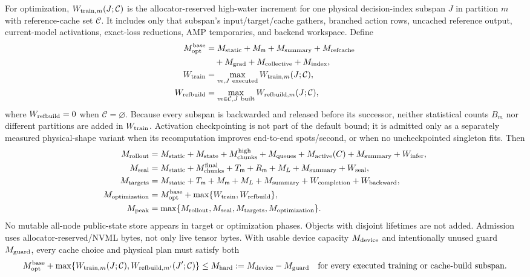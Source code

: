 \documentclass[10pt,a4paper]{article}
\begin{document}
For optimization, $W_{{\rm train},m}(J;\mathcal C)$ is the
allocator-reserved high-water increment for one physical decision-index
subspan $J$ in partition $m$ with reference-cache set $\mathcal C$.  It includes
only that subspan's input/target/cache gathers, branched action rows, uncached
reference output, current-model activations, exact-loss reductions, AMP
temporaries, and backend workspace.  Define
\begin{align*}
 M_{\rm opt}^{\rm base}
  &=M_{\rm static}+M_{\mathsf m}+M_{\rm summary}+M_{\rm refcache}\\
  &\quad+M_{\rm grad}+M_{\rm collective}+M_{\rm index},\\
 W_{\rm train}
  &=\max_{m,J\ {\rm executed}}W_{{\rm train},m}(J;\mathcal C),\\
 W_{\rm refbuild}
  &=\max_{m\in\mathcal C,J\ {\rm built}}
    W_{{\rm refbuild},m}(J;\mathcal C),
\end{align*}
where $W_{\rm refbuild}=0$ when $\mathcal C=\varnothing$.
Because every subspan is backwarded and released before its successor, neither
statistical counts $B_m$ nor different partitions are added in $W_{\rm train}$.
Activation checkpointing is not part of the default bound; it is admitted only
as a separately measured physical-shape variant when its recomputation improves
end-to-end spots/second, or when no uncheckpointed singleton fits.
Then
\begin{align*}
 M_{\rm rollout}
  &=M_{\rm static}+M_{\rm state}+M_{\rm chunks}^{\rm high}
    +M_{\rm queues}+M_{\rm active}(C)+M_{\rm summary}+W_{\rm infer},\\
 M_{\rm seal}
  &=M_{\rm static}+M_{\rm chunks}^{\rm final}+T_{\mathsf m}
    +R_{\mathsf m}+M_L+M_{\rm summary}+W_{\rm seal},\\
 M_{\rm targets}
  &=M_{\rm static}+T_{\mathsf m}+M_{\mathsf m}+M_L+M_{\rm summary}
    +W_{\rm completion}+W_{\rm backward},\\
 M_{\rm optimization}
  &=M_{\rm opt}^{\rm base}+\max\{W_{\rm train},W_{\rm refbuild}\},\\
 M_{\rm peak}&=\max\{M_{\rm rollout},M_{\rm seal},M_{\rm targets},
 M_{\rm optimization}\}.
\end{align*}
No mutable all-node public-state store appears in target or optimization
phases.  Objects with disjoint lifetimes are not added.  Admission uses
allocator-reserved/NVML bytes, not only live tensor bytes.  With usable device
capacity $M_{\rm device}$ and intentionally unused guard $M_{\rm guard}$, every
cache choice and physical plan must satisfy both
\[
 M_{\rm opt}^{\rm base}+\max\{W_{{\rm train},m}(J;\mathcal C),
 W_{{\rm refbuild},m'}(J';\mathcal C)\}
 \leq M_{\rm hard}:=M_{\rm device}-M_{\rm guard}
 \quad\textnormal{for every executed training or cache-build subspan}.
\]
\end{document}
